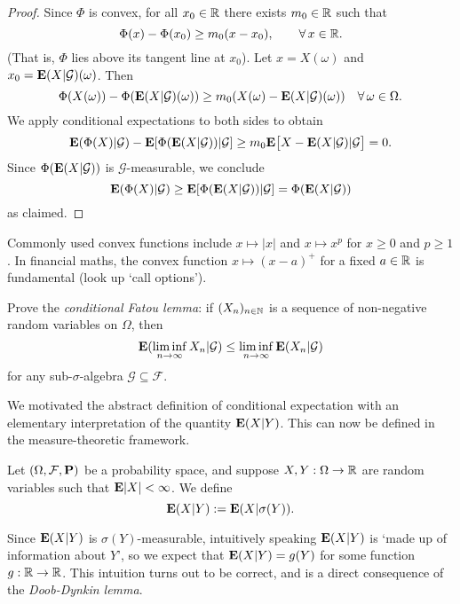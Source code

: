 \begin{proof}
    Since $\Phi$ is convex, for all $x_0\in\mathbb{R}$ there exists $m_0\in\mathbb{R}$ such that
    \begin{equation*}
        \Phi(x)-\Phi(x_0) \ge m_0(x-x_0), \qquad\forall\, x\in\mathbb{R}.
    \end{equation*}
    (That is, $\Phi$ lies above its tangent line at $x_0$). Let $x=X(\omega)$ and $x_0=\mathbf{E}(X|\mathcal{G})(\omega)$. Then
    \begin{equation*}
        \Phi(X(\omega))-\Phi(\mathbf{E}(X|\mathcal{G})(\omega)) \ge m_0(X(\omega)-\mathbf{E}(X|\mathcal{G})(\omega)) \quad\forall\,\omega\in\Omega.
    \end{equation*}
    We apply conditional expectations to both sides to obtain
    \begin{equation*}
        \mathbf{E}(\Phi(X)|\mathcal{G}) - \mathbf{E}[\Phi(\mathbf{E}(X|\mathcal{G}))|\mathcal{G}] \ge m_0\mathbf{E}\big[X-\mathbf{E}(X|\mathcal{G})|\mathcal{G}\big] = 0.
    \end{equation*}
    Since $\Phi(\mathbf{E}(X|\mathcal{G}))$ is $\mathcal{G}$-measurable, we conclude
    \begin{equation*}
        \mathbf{E}(\Phi(X)|\mathcal{G}) \ge \mathbf{E}[\Phi(\mathbf{E}(X|\mathcal{G}))|\mathcal{G}] = \Phi(\mathbf{E}(X|\mathcal{G}))
    \end{equation*}
    as claimed.
\end{proof}

\begin{example}
    Commonly used convex functions include $x\mapsto |x|$ and $x\mapsto x^p$ for $x\ge 0$ and $p\ge 1$. In financial maths, the convex function $x\mapsto (x-a)^+$ for a fixed $a\in\mathbb{R}$ is fundamental (look up `call options').
\end{example}

\begin{exercise}
\label{exer:conditional-Fatou}
    Prove the \emph{conditional Fatou lemma}: if $(X_n)_{n\in\mathbb{N}}$ is a sequence of non-negative random variables on $\Omega$, then
    \begin{equation}
        \mathbf{E}(\liminf_{n\to\infty}X_n|\mathcal{G}) \le \liminf_{n\to\infty}\mathbf{E}(X_n|\mathcal{G})
    \end{equation}
    for any sub-$\sigma$-algebra $\mathcal{G}\subseteq\mathcal{F}$.
\end{exercise}

We motivated the abstract definition of conditional expectation with an elementary interpretation of the quantity $\mathbf{E}(X|Y)$. This can now be defined in the measure-theoretic framework.
\begin{definition}
    Let $(\Omega,\mathcal{F},\mathbf{P})$ be a probability space, and suppose $X,Y:\Omega\to\mathbb{R}$ are random variables such that $\mathbf{E}|X|<\infty$. We define
    \begin{equation}
        \mathbf{E}(X|Y) := \mathbf{E}(X|\sigma(Y)).
    \end{equation}
\end{definition}
Since $\mathbf{E}(X|Y)$ is $\sigma(Y)$-measurable, intuitively speaking $\mathbf{E}(X|Y)$ is `made up of information about $Y$', so we expect that $\mathbf{E}(X|Y)=g(Y)$ for some function $g:\mathbb{R}\to\mathbb{R}$. This intuition turns out to be correct, and is a direct consequence of the \emph{Doob-Dynkin lemma}.

